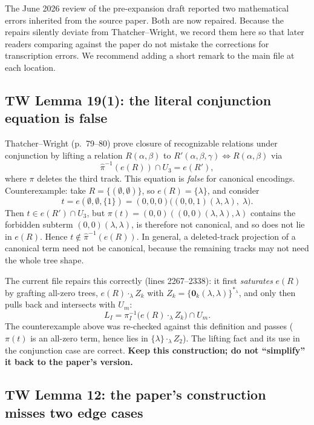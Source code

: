 \documentclass[11pt]{article}
\newcommand{\TW}{Thatcher--Wright}
\begin{document}
The June 2026 review of the pre-expansion draft reported two mathematical
errors inherited from the source paper.  Both are now repaired.  Because the
repairs silently deviate from \TW{}, we record them here so that later readers
comparing against the paper do not mistake the corrections for transcription
errors.  We recommend adding a short remark to the main file at each location.

\subsection{TW Lemma 19(1): the literal conjunction equation is false}

\TW{} (p.~79--80) prove closure of recognizable relations under conjunction by
lifting a relation \(R(\alpha,\beta)\) to
\(R'(\alpha,\beta,\gamma)\Leftrightarrow R(\alpha,\beta)\) via
\[
  \widehat\pi^{-1}(e(R))\cap U_3=e(R'),
\]
where \(\pi\) deletes the third track.  This equation is \emph{false} for
canonical encodings.  Counterexample: take \(R=\{(\emptyset,\emptyset)\}\), so
\(e(R)=\{\lambda\}\), and consider
\[
  t=e(\emptyset,\emptyset,\{1\})
   =(0,0,0)\bigl((0,0,1)(\lambda,\lambda),\;\lambda\bigr).
\]
Then \(t\in e(R')\cap U_3\), but
\(\pi(t)=(0,0)((0,0)(\lambda,\lambda),\lambda)\) contains the forbidden
subterm \((0,0)(\lambda,\lambda)\), is therefore not canonical, and so does not
lie in \(e(R)\).  Hence \(t\notin\widehat\pi^{-1}(e(R))\).  In general, a
deleted-track projection of a canonical term need not be canonical, because the
remaining tracks may not need the whole tree shape.

The current file repairs this correctly (lines 2267--2338): it first
\emph{saturates} \(e(R)\) by grafting all-zero trees,
\(e(R)\cdot_\lambda Z_k\) with \(Z_k=\{\mathbf 0_k(\lambda,\lambda)\}^{*_\lambda}\),
and only then pulls back and intersects with \(U_m\):
\[
  L_I=\pi_I^{-1}\bigl(e(R)\cdot_\lambda Z_k\bigr)\cap U_m .
\]
The counterexample above was re-checked against this definition and passes
(\(\pi(t)\) is an all-zero term, hence lies in
\(\{\lambda\}\cdot_\lambda Z_2\)).  The lifting fact and its use in the
conjunction case are correct.  \textbf{Keep this construction; do not
``simplify'' it back to the paper's version.}

\subsection{TW Lemma 12: the paper's construction misses two edge cases}
\end{document}
